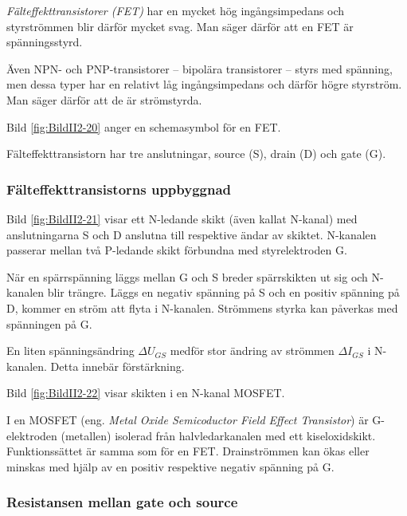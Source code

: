 \emph{Fälteffekttransistorer (FET)} har en mycket hög ingångsimpedans och
styrströmmen blir därför mycket svag.
Man säger därför att en FET är spänningsstyrd.

Även NPN- och PNP-transistorer -- bipolära transistorer -- styrs med spänning,
men dessa typer har en relativt låg ingångsimpedans och därför högre styrström.
Man säger därför att de är strömstyrda.


Bild \ref{fig:BildII2-20} anger en schemasymbol för en FET.

Fälteffekttransistorn har tre anslutningar, source (S), drain (D) och gate (G).


\subsubsection{Fälteffekttransistorns uppbyggnad}

Bild \ref{fig:BildII2-21} visar ett N-ledande skikt (även kallat N-kanal) med
anslutningarna S och D anslutna till respektive ändar av skiktet.
N-kanalen passerar mellan två P-ledande skikt förbundna med styrelektroden G.

När en spärrspänning läggs mellan G och S breder spärrskikten ut sig och N-kanalen blir trängre.
Läggs en negativ spänning på S och en positiv spänning på D, kommer en ström att flyta i N-kanalen.
Strömmens styrka kan påverkas med spänningen på G.

En liten spänningsändring \(\Delta U_{GS}\) medför stor ändring av strömmen
\(\Delta I_{GS}\) i N-kanalen. Detta innebär förstärkning.



Bild \ref{fig:BildII2-22} visar skikten i en N-kanal MOSFET.

I en MOSFET (eng. \emph{Metal Oxide Semicoductor Field Effect Transistor}) är
G-elektroden (metallen) isolerad från halvledarkanalen med ett kiseloxidskikt.
Funktionssättet är samma som för en FET.
Drainströmmen kan ökas eller minskas med hjälp av en positiv respektive negativ spänning på G.

\subsubsection{Resistansen mellan gate och source}


